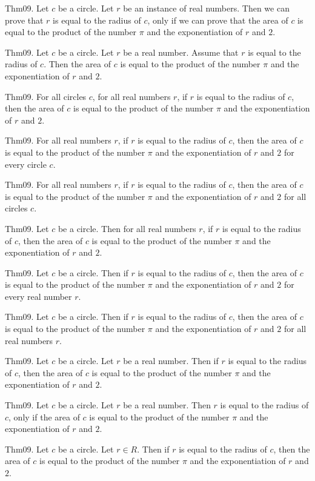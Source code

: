\documentclass{article}
\begin{document}
Thm09. Let $c$ be a circle. Let $r$ be an instance of real numbers. Then we can prove that $r$ is equal to the radius of $c$, only if we can prove that the area of $c$ is equal to the product of the number \(\pi\) and the exponentiation of $r$ and $2$.

Thm09. Let $c$ be a circle. Let $r$ be a real number. Assume that $r$ is equal to the radius of $c$. Then the area of $c$ is equal to the product of the number \(\pi\) and the exponentiation of $r$ and $2$.

Thm09. For all circles $c$, for all real numbers $r$, if $r$ is equal to the radius of $c$, then the area of $c$ is equal to the product of the number \(\pi\) and the exponentiation of $r$ and $2$.

Thm09. For all real numbers $r$, if $r$ is equal to the radius of $c$, then the area of $c$ is equal to the product of the number \(\pi\) and the exponentiation of $r$ and $2$ for every circle $c$.

Thm09. For all real numbers $r$, if $r$ is equal to the radius of $c$, then the area of $c$ is equal to the product of the number \(\pi\) and the exponentiation of $r$ and $2$ for all circles $c$.

Thm09. Let $c$ be a circle. Then for all real numbers $r$, if $r$ is equal to the radius of $c$, then the area of $c$ is equal to the product of the number \(\pi\) and the exponentiation of $r$ and $2$.

Thm09. Let $c$ be a circle. Then if $r$ is equal to the radius of $c$, then the area of $c$ is equal to the product of the number \(\pi\) and the exponentiation of $r$ and $2$ for every real number $r$.

Thm09. Let $c$ be a circle. Then if $r$ is equal to the radius of $c$, then the area of $c$ is equal to the product of the number \(\pi\) and the exponentiation of $r$ and $2$ for all real numbers $r$.

Thm09. Let $c$ be a circle. Let $r$ be a real number. Then if $r$ is equal to the radius of $c$, then the area of $c$ is equal to the product of the number \(\pi\) and the exponentiation of $r$ and $2$.

Thm09. Let $c$ be a circle. Let $r$ be a real number. Then $r$ is equal to the radius of $c$, only if the area of $c$ is equal to the product of the number \(\pi\) and the exponentiation of $r$ and $2$.

Thm09. Let $c$ be a circle. Let $r \in R$. Then if $r$ is equal to the radius of $c$, then the area of $c$ is equal to the product of the number \(\pi\) and the exponentiation of $r$ and $2$.
\end{document}
